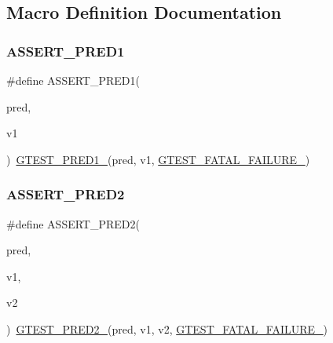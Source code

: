 \subsection{Macro Definition Documentation}
\mbox{\label{googletest-master_2googletest_2include_2gtest_2gtest__pred__impl_8h_a7d72f779b7d39b8f73a563ebc6d0604b}} 
\subsubsection{\texorpdfstring{ASSERT\_PRED1}{ASSERT\_PRED1}}
{\footnotesize\ttfamily \#define A\+S\+S\+E\+R\+T\+\_\+\+P\+R\+E\+D1(\begin{DoxyParamCaption}\item[{}]{pred,  }\item[{}]{v1 }\end{DoxyParamCaption})~\mbox{\hyperlink{_obj__test_2lib_2googletest-release-1_88_81_2googletest_2include_2gtest_2gtest__pred__impl_8h_ad44cf322952076d85305bbdf39769ac1}{G\+T\+E\+S\+T\+\_\+\+P\+R\+E\+D1\+\_\+}}(pred, v1, \mbox{\hyperlink{_obj__test_2lib_2googletest-release-1_88_81_2googletest_2include_2gtest_2internal_2gtest-internal_8h_a0f9a4c3ea82cc7bf4478eaffdc168358}{G\+T\+E\+S\+T\+\_\+\+F\+A\+T\+A\+L\+\_\+\+F\+A\+I\+L\+U\+R\+E\+\_\+}})}

\mbox{\label{googletest-master_2googletest_2include_2gtest_2gtest__pred__impl_8h_a4e9b777cce4e5423f4c2e491be7aa818}} 
\subsubsection{\texorpdfstring{ASSERT\_PRED2}{ASSERT\_PRED2}}
{\footnotesize\ttfamily \#define A\+S\+S\+E\+R\+T\+\_\+\+P\+R\+E\+D2(\begin{DoxyParamCaption}\item[{}]{pred,  }\item[{}]{v1,  }\item[{}]{v2 }\end{DoxyParamCaption})~\mbox{\hyperlink{_obj__test_2lib_2googletest-release-1_88_81_2googletest_2include_2gtest_2gtest__pred__impl_8h_ac560264104bd030b64034505d294a7b6}{G\+T\+E\+S\+T\+\_\+\+P\+R\+E\+D2\+\_\+}}(pred, v1, v2, \mbox{\hyperlink{_obj__test_2lib_2googletest-release-1_88_81_2googletest_2include_2gtest_2internal_2gtest-internal_8h_a0f9a4c3ea82cc7bf4478eaffdc168358}{G\+T\+E\+S\+T\+\_\+\+F\+A\+T\+A\+L\+\_\+\+F\+A\+I\+L\+U\+R\+E\+\_\+}})}

